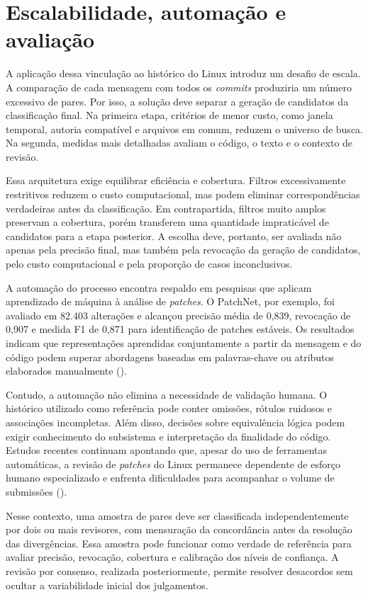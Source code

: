 \section{Escalabilidade, automação e avaliação}

A aplicação dessa vinculação ao histórico do Linux introduz um desafio de escala. A comparação de cada mensagem com todos os \textit{commits} produziria um número excessivo de pares. Por isso, a solução deve separar a geração de candidatos da classificação final. Na primeira etapa, critérios de menor custo, como janela temporal, autoria compatível e arquivos em comum, reduzem o universo de busca. Na segunda, medidas mais detalhadas avaliam o código, o texto e o contexto de revisão.

Essa arquitetura exige equilibrar eficiência e cobertura. Filtros excessivamente restritivos reduzem o custo computacional, mas podem eliminar correspondências verdadeiras antes da classificação. Em contrapartida, filtros muito amplos preservam a cobertura, porém transferem uma quantidade impraticável de candidatos para a etapa posterior. A escolha deve, portanto, ser avaliada não apenas pela precisão final, mas também pela revocação da geração de candidatos, pelo custo computacional e pela proporção de casos inconclusivos.

A automação do processo encontra respaldo em pesquisas que aplicam aprendizado de máquina à análise de \textit{patches}. O PatchNet, por exemplo, foi avaliado em 82.403 alterações e alcançou precisão média de 0,839, revocação de 0,907 e medida F1 de 0,871 para identificação de patches estáveis. Os resultados indicam que representações aprendidas conjuntamente a partir da mensagem e do código podem superar abordagens baseadas em palavras-chave ou atributos elaborados manualmente (\cite{hoang2021patchnet}). 

Contudo, a automação não elimina a necessidade de validação humana. O histórico utilizado como referência pode conter omissões, rótulos ruidosos e associações incompletas. Além disso, decisões sobre equivalência lógica podem exigir conhecimento do subsistema e interpretação da finalidade do código. Estudos recentes continuam apontando que, apesar do uso de ferramentas automáticas, a revisão de \textit{patches} do Linux permanece dependente de esforço humano especializado e enfrenta dificuldades para acompanhar o volume de submissões (\cite{lin2026reliable}). 

Nesse contexto, uma amostra de pares deve ser classificada independentemente por dois ou mais revisores, com mensuração da concordância antes da resolução das divergências. Essa amostra pode funcionar como verdade de referência para avaliar precisão, revocação, cobertura e calibração dos níveis de confiança. A revisão por consenso, realizada posteriormente, permite resolver desacordos sem ocultar a variabilidade inicial dos julgamentos.

